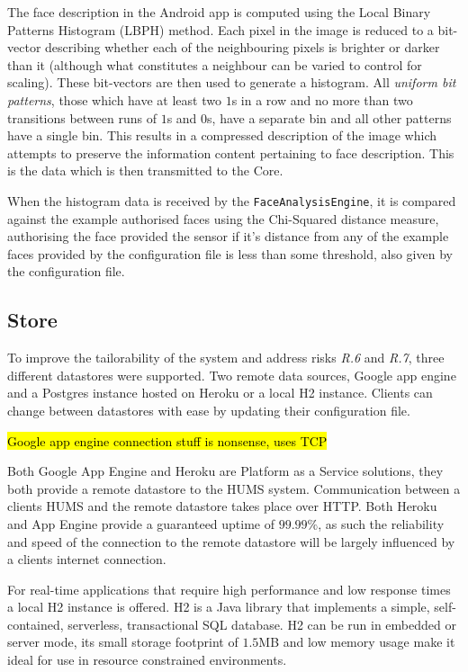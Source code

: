 \documentclass[10pt,a4paper]{article}
\begin{document}
The face description in the Android app is computed using the Local Binary Patterns Histogram (LBPH) \cite{ahonen2006face} method. Each pixel in the image is reduced to a bit-vector describing whether each of the neighbouring pixels is brighter or darker than it (although what constitutes a neighbour can be varied to control for scaling). These bit-vectors are then used to generate a histogram. All \emph{uniform bit patterns}, those which have at least two $1$s in a row and no more than two transitions between runs of $1$s and $0$s, have a separate bin and all other patterns have a single bin. This results in a compressed description of the image which attempts to preserve the information content pertaining to face description. This is the data which is then transmitted to the Core.

When the histogram data is received by the \texttt{FaceAnalysisEngine}, it is compared against the example authorised faces using the Chi-Squared distance measure, authorising the face provided the sensor if it's distance from any of the example faces provided by the configuration file is less than some threshold, also given by the configuration file.



\subsection{Store}
\label{sec:store}
To improve the tailorability of the system and address risks \emph{R.6} and \emph{R.7}, three different datastores were supported. Two remote data sources, Google app engine and a Postgres instance hosted on Heroku or a local H2 instance. Clients can change between datastores with ease by updating their configuration file.

\hl{Google app engine connection stuff is nonsense, uses TCP}

Both Google App Engine and Heroku are Platform as a Service solutions, they both provide a remote datastore to the HUMS system. Communication between a clients HUMS and the remote datastore takes place over HTTP. Both Heroku and App Engine provide a guaranteed uptime of $99.99\%$, as such the reliability and speed of the connection to the remote datastore will be largely influenced by a clients internet connection.

For real-time applications that require high performance and low response times a local H2 instance is offered. H2 is a Java library that implements a simple, self-contained, serverless, transactional SQL database. H2 can be run in embedded or server mode, its small storage footprint of $1.5$MB and low memory usage make it ideal for use in resource constrained environments. 
\end{document}
